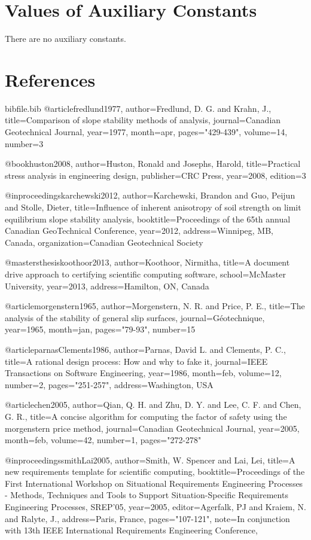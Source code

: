 \documentclass[12pt]{article}
\begin{document}
\section{Values of Auxiliary Constants}
\label{Sec:AuxConstants}
There are no auxiliary constants.
\section{References}
\label{Sec:References}
\begin{filecontents*}{bibfile.bib}
@article{fredlund1977,
author={Fredlund, D. G. and Krahn, J.},
title={Comparison of slope stability methods of analysis},
journal={Canadian Geotechnical Journal},
year={1977},
month=apr,
pages={"429-439"},
volume={14},
number={3}}

@book{huston2008,
author={Huston, Ronald and Josephs, Harold},
title={Practical stress analysis in engineering design},
publisher={CRC Press},
year={2008},
edition={3}}

@inproceedings{karchewski2012,
author={Karchewski, Brandon and Guo, Peijun and Stolle, Dieter},
title={Influence of inherent anisotropy of soil strength on limit equilibrium slope stability analysis},
booktitle={Proceedings of the 65th annual Canadian GeoTechnical Conference},
year={2012},
address={Winnipeg, MB, Canada},
organization={Canadian Geotechnical Society}}

@mastersthesis{koothoor2013,
author={Koothoor, Nirmitha},
title={A document drive approach to certifying scientific computing software},
school={McMaster University},
year={2013},
address={Hamilton, ON, Canada}}

@article{morgenstern1965,
author={Morgenstern, N. R. and Price, P. E.},
title={The analysis of the stability of general slip surfaces},
journal={Géotechnique},
year={1965},
month=jan,
pages={"79-93"},
number={15}}

@article{parnasClements1986,
author={Parnas, David L. and Clements, P. C.},
title={A rational design process: How and why to fake it},
journal={IEEE Transactions on Software Engineering},
year={1986},
month=feb,
volume={12},
number={2},
pages={"251-257"},
address={Washington, USA}}

@article{chen2005,
author={Qian, Q. H. and Zhu, D. Y. and Lee, C. F. and Chen, G. R.},
title={A concise algorithm for computing the factor of safety using the morgenstern price method},
journal={Canadian Geotechnical Journal},
year={2005},
month=feb,
volume={42},
number={1},
pages={"272-278"}}

@inproceedings{smithLai2005,
author={Smith, W. Spencer and Lai, Lei},
title={A new requirements template for scientific computing},
booktitle={Proceedings of the First International Workshop on Situational Requirements Engineering Processes - Methods, Techniques and Tools to Support Situation-Specific Requirements Engineering Processes, SREP'05},
year={2005},
editor={Agerfalk, PJ and Kraiem, N. and Ralyte, J.},
address={Paris, France},
pages={"107-121"},
note={In conjunction with 13th IEEE International Requirements Engineering Conference,}}


\end{filecontents*}
\end{document}
